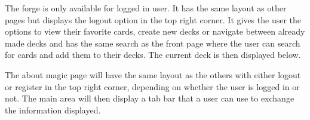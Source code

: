 \documentclass[paper=a4, fontsize=11pt]{scrartcl} %
\numberwithin{equation}{section} %
\numberwithin{figure}{section} %
\numberwithin{table}{section} %
\begin{document}
The forge is only available for logged in user. It has the same layout as other pages but displays the logout option in the top right corner. It gives the user the options to view their favorite cards, create new decks or navigate between already made decks and has the same search as the front page where the user can search for cards and add them to their decks. The current deck is then displayed below.
\begin{center}
\end{center}
The about magic page will have the same layout as the others with either logout or register in the top right corner, depending on whether the user is logged in or not. The main area will then display a tab bar that a user can use to exchange the information displayed.
\begin{center}
\end{center}
\end{document}
